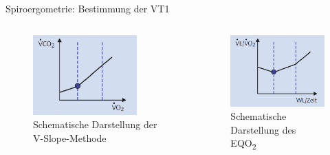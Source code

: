 \documentclass[colorBG,slideColor,9pt]{beamer}
\begin{document}
\begin{frame}{Spiroergometrie: Bestimmung der VT1}
\begin{columns}
\begin{column}{5cm}
\begin{figure}[H]
\begin{center}
\includegraphics[width=40mm]{Bilder/vslope.png}
\caption{Schematische Darstellung der V-Slope-Methode}
\end{center}
\end{figure}
\end{column}
\begin{column}{5cm}
\begin{figure}[H]
\begin{center}
\includegraphics[width=40mm]{Bilder/eqo2.png}
\caption{Schematische Darstellung des EQO\textsubscript{2}}
\end{center}
\end{figure}
\end{column}
\end{columns}
\end{frame}
\end{document}
